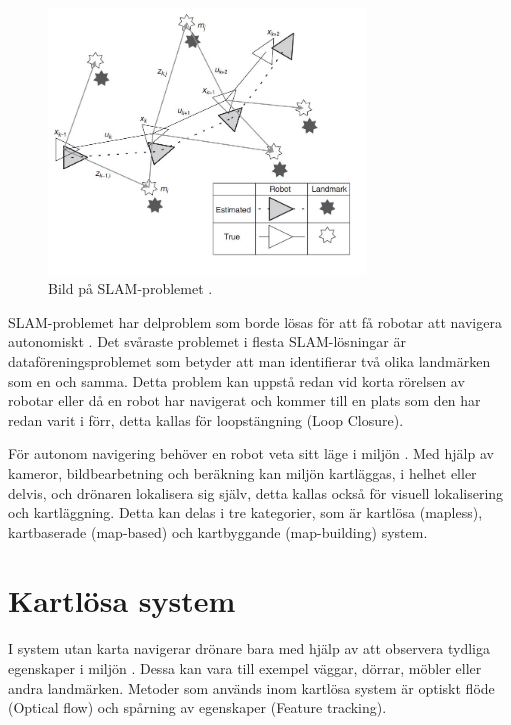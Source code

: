 \begin{figure}[ht]
    \begin{center}
    \includegraphics[width=0.75\textwidth]{slam-problem.JPG}
    \caption{Bild på SLAM-problemet \citep{realslamproblem}.}
    \label{slam-problemet}
    \end{center}
\end{figure}

SLAM-problemet har delproblem som borde lösas för att få robotar att navigera autonomiskt \citep{slamproblem}. Det svåraste problemet i flesta SLAM-lösningar är dataföreningsproblemet som betyder att man identifierar två olika landmärken som en och samma. Detta problem kan uppstå redan vid korta rörelsen av robotar eller då en robot har navigerat och kommer till en plats som den har redan varit i förr, detta kallas för loopstängning (Loop Closure). 

För autonom navigering behöver en robot veta sitt läge i miljön \citep{geospatial}. Med hjälp av kameror, bildbearbetning och beräkning kan miljön kartläggas, i helhet eller delvis, och drönaren lokalisera sig själv, detta kallas också för visuell lokalisering och kartläggning. Detta kan delas i tre kategorier, som är kartlösa (mapless), kartbaserade (map-based) och kartbyggande (map-building) system. 

\section{Kartlösa system}

I system utan karta navigerar drönare bara med hjälp av att observera tydliga egenskaper i miljön \citep{982903}. Dessa kan vara till exempel väggar, dörrar, möbler eller andra landmärken. Metoder som används inom kartlösa system är optiskt flöde (Optical flow) och spårning av egenskaper (Feature tracking). 

